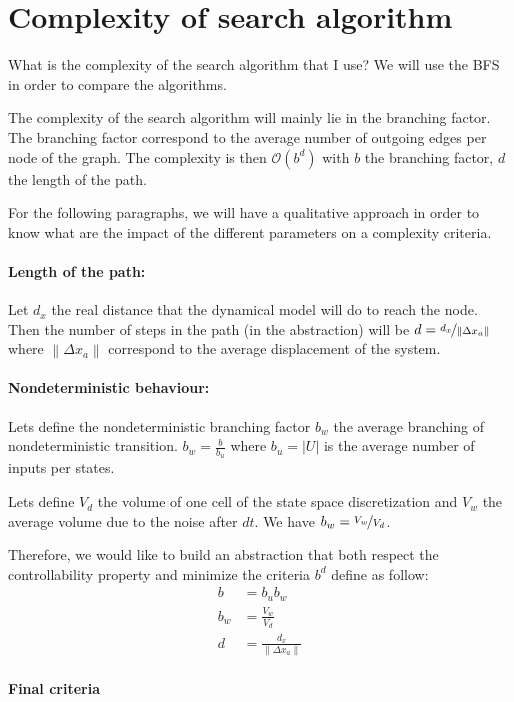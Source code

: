 \documentclass{article}
\theoremstyle{named}
\begin{document}
\section{Complexity of search algorithm}
What is the complexity of the search algorithm that I use?
We will use the BFS in order to compare the algorithms.

The complexity of the search algorithm will mainly lie in the branching factor.
The branching factor correspond to the average number of outgoing edges per node of the graph.
The complexity is then $\mathcal{O}(b^d)$ with $b$ the branching factor, $d$ the length of the path. 

For the following paragraphs, we will have a qualitative approach in order to know what are the impact of the different parameters on a complexity criteria.

\paragraph{Length of the path:}
Let $d_x$ the real distance that the dynamical model will do to reach the node.
Then the number of steps in the path (in the abstraction) will be $d = \nicefrac{d_x}{\left \| \Delta x_a \right \|}$ where  $\left \| \Delta x_a \right \|$ correspond to the average displacement of the system.

\paragraph{Nondeterministic behaviour:}
Lets define the nondeterministic branching factor $b_w$ the average branching of nondeterministic transition. $b_w = \frac{b}{b_u}$ where $b_u = \left | U \right |$ is the average number of inputs per states.

Lets define $V_d$ the volume of one cell of the state space discretization and $V_w$ the average volume due to the noise after $dt$. We have $b_w = \nicefrac{V_w}{V_d}$.

Therefore, we would like to build an abstraction that both respect the controllability property and minimize the criteria $b^d$ define as follow:
\begin{align*}
b   &= b_u b_w\\
b_w &= \frac{V_w}{V_d}\\
d &= \frac{d_x}{\left \| \Delta x_a \right \|}
\end{align*}

\paragraph{Final criteria}
\end{document}
